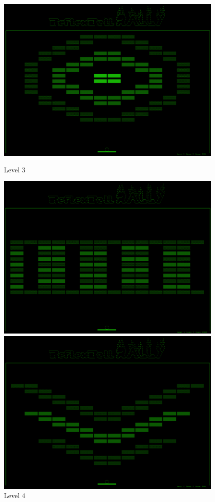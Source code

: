\begin{figure}[h!]
\begin{minipage}[b]{0.32\textwidth}
\includegraphics[width=\linewidth]{figs/screenshots/level3.png}
\caption{Level 3}
\label{fig:level3}
\end{minipage}\hfill
\begin{minipage}[b]{0.32\textwidth}
\includegraphics[width=\linewidth]{figs/screenshots/level4.png}
\caption{Level 4}
\label{fig:level4}
\end{minipage}\hfill
\begin{minipage}[b]{0.32\textwidth}
\includegraphics[width=\linewidth]{figs/screenshots/level5.png}

\end{minipage}
\end{figure}
